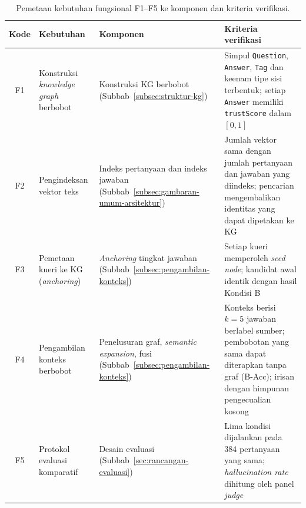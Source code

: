 \begin{table}[!htbp]
\centering
\caption{Pemetaan kebutuhan fungsional F1--F5 ke komponen dan kriteria verifikasi.}
\label{tab:checklist-f1-f5}
\small
\begin{tabular}{|c|p{}|p{}|p{}|}
\hline
\textbf{Kode} & \textbf{Kebutuhan} & \textbf{Komponen} & \textbf{Kriteria verifikasi} \\
\hline
F1 & Konstruksi \emph{knowledge graph} berbobot & Konstruksi KG berbobot (Subbab~\ref{subsec:struktur-kg}) & Simpul \texttt{Question}, \texttt{Answer}, \texttt{Tag} dan keenam tipe sisi terbentuk; setiap \texttt{Answer} memiliki \texttt{trustScore} dalam $[0,1]$ \\
\hline
F2 & Pengindeksan vektor teks & Indeks pertanyaan dan indeks jawaban (Subbab~\ref{subsec:gambaran-umum-arsitektur}) & Jumlah vektor sama dengan jumlah pertanyaan dan jawaban yang diindeks; pencarian mengembalikan identitas yang dapat dipetakan ke KG \\
\hline
F3 & Pemetaan kueri ke KG (\emph{anchoring}) & \emph{Anchoring} tingkat jawaban (Subbab~\ref{subsec:pengambilan-konteks}) & Setiap kueri memperoleh \emph{seed node}; kandidat awal identik dengan hasil Kondisi B \\
\hline
F4 & Pengambilan konteks berbobot & Penelusuran graf, \emph{semantic expansion}, fusi (Subbab~\ref{subsec:pengambilan-konteks}) & Konteks berisi $k{=}5$ jawaban berlabel sumber; pembobotan yang sama dapat diterapkan tanpa graf (B-Acc); irisan dengan himpunan pengecualian kosong \\
\hline
F5 & Protokol evaluasi komparatif & Desain evaluasi (Subbab~\ref{sec:rancangan-evaluasi}) & Lima kondisi dijalankan pada 384 pertanyaan yang sama; \emph{hallucination rate} dihitung oleh panel \emph{judge} \\
\hline
\end{tabular}
\end{table}